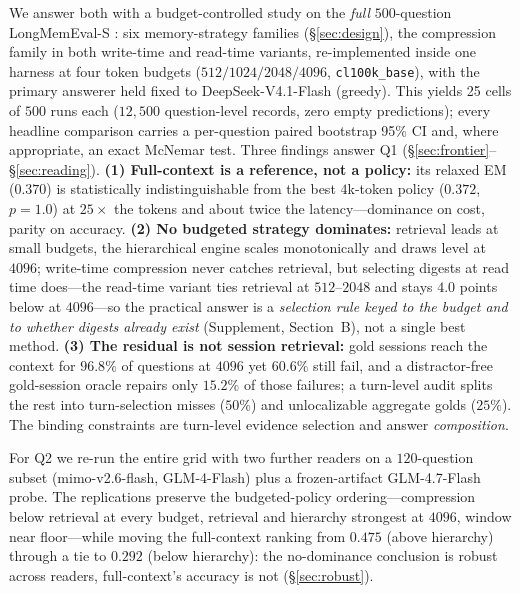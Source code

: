 \documentclass{article} %
\begin{document}
We answer both with a budget-controlled study on the \emph{full} $500$-question LongMemEval-S
\citep{wu2024longmemeval}: six memory-strategy families (\S\ref{sec:design}), the compression
family in both write-time and read-time variants, re-implemented inside one
harness at four token budgets ($512/1024/2048/4096$, \texttt{cl100k\_base}), with the primary
answerer held fixed to DeepSeek-V4.1-Flash (greedy). This yields 25 cells of $500$ runs each
($12{,}500$ question-level records, zero empty predictions); every headline comparison carries
a per-question paired bootstrap 95\% CI and, where appropriate, an exact McNemar test. Three
findings answer Q1 (\S\ref{sec:frontier}--\S\ref{sec:reading}). \textbf{(1) Full-context is a
reference, not a policy:} its relaxed EM ($0.370$) is statistically indistinguishable from the
best $4$k-token policy ($0.372$, $p{=}1.0$) at $25\times$ the tokens and about twice the
latency---dominance on cost, parity on accuracy. \textbf{(2) No budgeted strategy dominates:}
retrieval leads at small budgets, the hierarchical engine scales monotonically and draws level
at $4096$; write-time compression never catches retrieval, but selecting digests at read time
does---the read-time variant ties retrieval at $512$--$2048$ and stays $4.0$ points below at
$4096$---so the practical answer is a \emph{selection rule keyed to the budget and to whether
digests already exist} (Supplement, Section~B), not a single best method.
\textbf{(3) The residual is not session retrieval:} gold sessions reach the context for
$96.8\%$ of questions at $4096$ yet $60.6\%$ still fail, and a distractor-free gold-session
oracle repairs only $15.2\%$ of those failures; a turn-level audit splits the rest into
turn-selection misses ($50\%$) and unlocalizable aggregate golds ($25\%$). The binding
constraints are turn-level evidence selection and answer \emph{composition}.

For Q2 we re-run the entire grid with two further readers on a $120$-question subset
(mimo-v2.6-flash, GLM-4-Flash) plus a frozen-artifact GLM-4.7-Flash probe. The replications
preserve the budgeted-policy ordering---compression below retrieval at every budget,
retrieval and hierarchy strongest at $4096$, window near floor---while moving the full-context
ranking from $0.475$ (above hierarchy) through a tie to $0.292$ (below hierarchy): the
no-dominance conclusion is robust across readers, full-context's accuracy is not
(\S\ref{sec:robust}).
\end{document}
